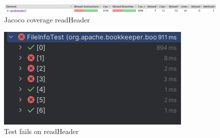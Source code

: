 \documentclass[12pt, a4paper]{article}
\begin{document}
  \begin{figure}
    \includegraphics[width=\linewidth]{./images/file_info/JacocoCoveragereadHeader1.png}
    \caption{Jacoco coverage readHeader}
    \label{fig:JacocoCoveragereadHeader1}
  \end{figure}

  \begin{figure}
    \includegraphics[width=\linewidth]{./images/file_info/TestCasesFails.png}
    \caption{Test fails on readHeader}
    \label{fig:TestFailsReadHeader}
  \end{figure}
\end{document}
